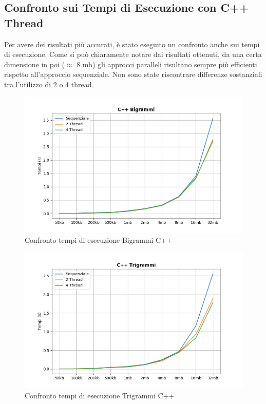 \documentclass[10pt,twocolumn,letterpaper]{article}
\begin{document}
\subsection{Confronto sui Tempi di Esecuzione con C++ Thread}
Per avere dei risultati più accurati, è stato eseguito un  confronto anche sui tempi di esecuzione.\newline
Come si può chiaramente notare dai risultati ottenuti, da una certa dimensione in poi ($\approx$ 8 mb) gli approcci paralleli risultano sempre più efficienti rispetto all'approccio sequenziale. Non sono state riscontrare differenze sostanziali tra l'utilizzo di 2 o 4 thread.
\begin{figure}[h]
\includegraphics[width=\linewidth]{Plots/tempi_cpp_bigrammi.png}
\caption{Confronto tempi di esecuzione Bigrammi C++}
\end{figure}

\begin{figure}[h]
\includegraphics[width=\linewidth]{Plots/tempi_cpp_trigrammi.png}
\caption{Confronto tempi di esecuzione Trigrammi C++}
\end{figure}
\newpage
\end{document}
